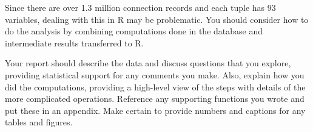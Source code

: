 \documentclass[11pt]{article}
\begin{document}
Since there are over 1.3 million connection records and each tuple has
93 variables, dealing with this in R may be problematic.  You should
consider how to do the analysis by combining computations done in the
database and intermediate results transferred to R.

Your report should describe the data and discuss questions that you
explore, providing statistical support for any comments you make.
Also, explain how you did the computations, providing a high-level
view of the steps with details of the more complicated operations.
Reference any supporting functions you wrote and put these in an
appendix.  Make certain to provide numbers and captions for any tables
and figures.
\end{document}
